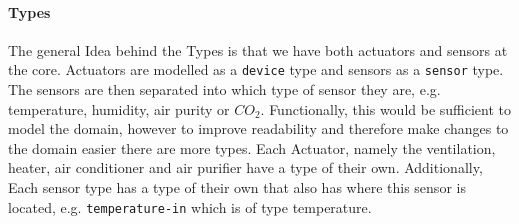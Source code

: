 \paragraph{Types}
The general Idea behind the Types is that we have both actuators and sensors at the core.
Actuators are modelled as a \texttt{device} type and sensors as a \texttt{sensor} type.
The sensors are then separated into which type of sensor they are, e.g. temperature, humidity, air purity or $CO_2$.
Functionally, this would be sufficient to model the domain, however to improve readability and therefore make changes to the domain easier there are more types.
Each Actuator, namely the ventilation, heater, air conditioner and air purifier have a type of their own.
Additionally, Each sensor type has a type of their own that also has where this sensor is located, e.g. \texttt{temperature-in} which is of type temperature.

